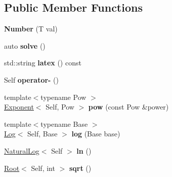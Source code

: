 \subsection*{\-Public \-Member \-Functions}
\begin{DoxyCompactItemize}
\item 
\hypertarget{classlatex_1_1math_1_1Number_ad95c73319da794a949d07258f3cd23f3}{{\bfseries \-Number} (\-T val)}\label{classlatex_1_1math_1_1Number_ad95c73319da794a949d07258f3cd23f3}

\item 
\hypertarget{classlatex_1_1math_1_1Number_a828245764da36255de6fc5de3ff419cf}{auto {\bfseries solve} ()}\label{classlatex_1_1math_1_1Number_a828245764da36255de6fc5de3ff419cf}

\item 
\hypertarget{classlatex_1_1math_1_1Number_a4ba49b934f893e3582f755a2830cc9f5}{std\-::string {\bfseries latex} () const }\label{classlatex_1_1math_1_1Number_a4ba49b934f893e3582f755a2830cc9f5}

\item 
\hypertarget{classlatex_1_1math_1_1Number_a8ab91d58fe8e6708b72d53fb0266b9c9}{\-Self {\bfseries operator-\/} ()}\label{classlatex_1_1math_1_1Number_a8ab91d58fe8e6708b72d53fb0266b9c9}

\item 
\hypertarget{classlatex_1_1math_1_1Number_aa2f067bcad6aa2afd7fb83faea74336a}{{\footnotesize template$<$typename Pow $>$ }\\\hyperlink{classlatex_1_1math_1_1Exponent}{\-Exponent}$<$ \-Self, \-Pow $>$ {\bfseries pow} (const \-Pow \&power)}\label{classlatex_1_1math_1_1Number_aa2f067bcad6aa2afd7fb83faea74336a}

\item 
\hypertarget{classlatex_1_1math_1_1Number_af8ac2784e513ee0761c9a42972fc9744}{{\footnotesize template$<$typename Base $>$ }\\\hyperlink{classlatex_1_1math_1_1Log}{\-Log}$<$ \-Self, \-Base $>$ {\bfseries log} (\-Base base)}\label{classlatex_1_1math_1_1Number_af8ac2784e513ee0761c9a42972fc9744}

\item 
\hypertarget{classlatex_1_1math_1_1Number_a5a808cf6ecbb48144d85cad64def6b42}{\hyperlink{classlatex_1_1math_1_1NaturalLog}{\-Natural\-Log}$<$ \-Self $>$ {\bfseries ln} ()}\label{classlatex_1_1math_1_1Number_a5a808cf6ecbb48144d85cad64def6b42}

\item 
\hypertarget{classlatex_1_1math_1_1Number_a41e6361f370fe20ed6bf147807d8edb3}{\hyperlink{classlatex_1_1math_1_1Root}{\-Root}$<$ \-Self, int $>$ {\bfseries sqrt} ()}\label{classlatex_1_1math_1_1Number_a41e6361f370fe20ed6bf147807d8edb3}

\end{DoxyCompactItemize}
